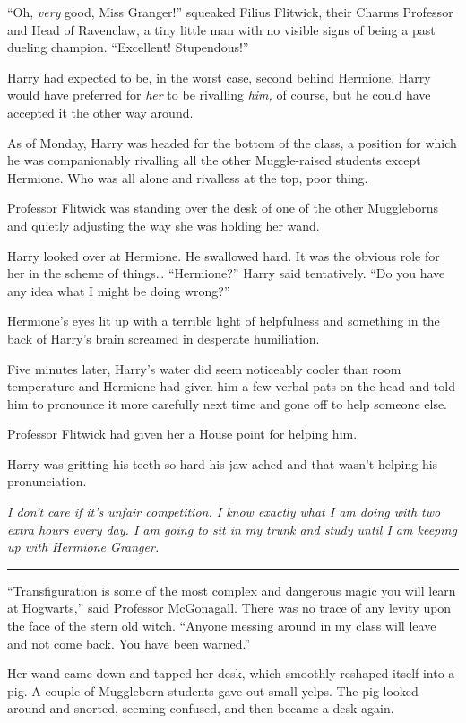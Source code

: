 ``Oh, \emph{very} good, Miss Granger!'' squeaked Filius Flitwick, their
Charms Professor and Head of Ravenclaw, a tiny little man with no
visible signs of being a past dueling champion. ``Excellent!
Stupendous!''

Harry had expected to be, in the worst case, second behind Hermione.
Harry would have preferred for \emph{her} to be rivalling \emph{him,} of
course, but he could have accepted it the other way around.

As of Monday, Harry was headed for the bottom of the class, a position
for which he was companionably rivalling all the other Muggle-raised
students except Hermione. Who was all alone and rivalless at the top,
poor thing.

Professor Flitwick was standing over the desk of one of the other
Muggleborns and quietly adjusting the way she was holding her wand.

Harry looked over at Hermione. He swallowed hard. It was the obvious
role for her in the scheme of things\ldots{} ``Hermione?'' Harry said
tentatively. ``Do you have any idea what I might be doing wrong?''

Hermione's eyes lit up with a terrible light of helpfulness and
something in the back of Harry's brain screamed in desperate
humiliation.

Five minutes later, Harry's water did seem noticeably cooler than room
temperature and Hermione had given him a few verbal pats on the head and
told him to pronounce it more carefully next time and gone off to help
someone else.

Professor Flitwick had given her a House point for helping him.

Harry was gritting his teeth so hard his jaw ached and that wasn't
helping his pronunciation.

\emph{I don't care if it's unfair competition. I know exactly what I am
doing with two extra hours every day. I am going to sit in my trunk and
study until I am keeping up with Hermione Granger.}

\begin{center}\rule{3in}{0.4pt}\end{center}

``Transfiguration is some of the most complex and dangerous magic you
will learn at Hogwarts,'' said Professor McGonagall. There was no trace
of any levity upon the face of the stern old witch. ``Anyone messing
around in my class will leave and not come back. You have been warned.''

Her wand came down and tapped her desk, which smoothly reshaped itself
into a pig. A couple of Muggleborn students gave out small yelps. The
pig looked around and snorted, seeming confused, and then became a desk
again.

